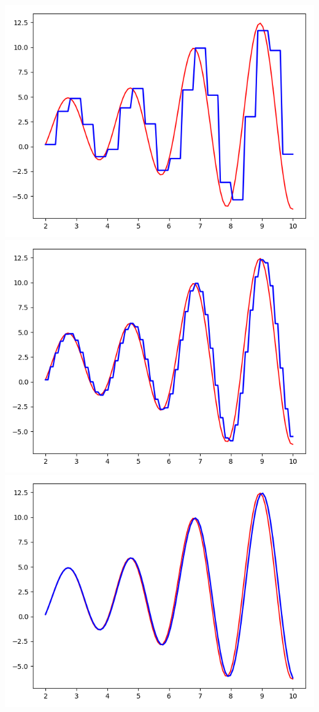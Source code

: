 \documentclass[11pt,class=report,crop=false]{standalone}
\begin{document}
\begin{center}
\includegraphics[scale=\myscale,scale=0.3]{figures/pythontf-1var-02c}
\includegraphics[scale=\myscale,scale=0.3]{figures/pythontf-1var-02d}
\includegraphics[scale=\myscale,scale=0.3]{figures/pythontf-1var-02e}
\end{center}
\end{document}

